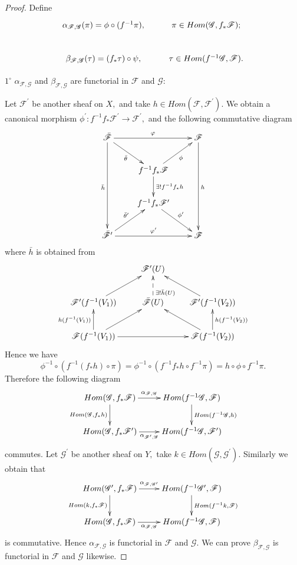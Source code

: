 \begin{proof}
Define
\[ \xymatrix{
   \alpha_{\mathscr{F},\mathscr{G}}(\pi)=\phi\circ(f^{-1}\pi), &
   \pi\in Hom(\mathscr{G}, f_{\ast}\mathscr{F});              \\
   \beta_{\mathscr{F},\mathscr{G}}(\tau)=(f_{\ast}\tau)\circ\psi, &
   \tau\in Hom(f^{-1}\mathscr{G}, \mathscr{F}). }  \]

$\mathit{1^{\circ}}$ $\alpha_{\mathscr{F},\mathscr{G}}$ and
$\beta_{\mathscr{F},\mathscr{G}}$ are functorial in $\mathscr{F}$
and $\mathscr{G}:$

Let $\mathscr{F}^{\prime}$ be another sheaf on $X,$ and take $h\in
Hom(\mathscr{F}, \mathscr{F}^{\prime}).$ We obtain a canonical
morphism $\phi^{\prime}:
f^{-1}f_{\ast}\mathscr{F}^{\prime}\rightarrow \mathscr{F}^{\prime},$
and the following commutative diagram
\[ \xymatrix{
   \bar{\mathscr{F}} \ar[ddd]_{\bar{h}} \ar[dr]_-{\bar{\theta}}
   \ar[rr]^-{\varphi} & & \mathscr{F} \ar[ddd]^h              \\
   & f^{-1}f_{\ast}\mathscr{F} \ar[ur]_-{\phi} \ar[d]^-{\exists!
   f^{-1}f_{\ast}h}                                           \\
   & f^{-1}f_{\ast}\mathscr{F}^{\prime} \ar[dr]^-{\phi^{\prime}}\\
   \bar{\mathscr{F}}^{\prime} \ar[ur]^-{\bar{\theta}^{\prime}}
   \ar[rr]^-{\varphi^{\prime}} & & \mathscr{F} }  \]
where $\bar{h}$ is obtained from
\[ \xymatrix{
   & \mathscr{F}^{\prime}(U) \\
   \mathscr{F}^{\prime}(f^{-1}(V_1)) \ar[ur] & \bar{\mathscr{F}}(U)
   \ar@{-->}[u]_(.3){\exists! \bar{h}(U)} &
   \mathscr{F}^{\prime}(f^{-1}(V_2)) \ar[ul]                       \\
   \mathscr{F}(f^{-1}(V_1)) \ar[u]^{h(f^{-1}(V_1))} \ar[ur] \ar[rr] &
   & \mathscr{F}(f^{-1}(V_2)) \ar[ul] \ar[u]_{h(f^{-1}(V_2))} }  \]
Hence we have
$$\phi^{-1}\circ(f^{-1}(f_{\ast}h)\circ\pi)=\phi^{-1}\circ(f^{-1}f_{\ast}h\circ f^{-1}\pi)=h\circ\phi\circ f^{-1}\pi.$$
Therefore the following diagram
\[ \xymatrix{
   Hom(\mathscr{G}, f_{\ast}\mathscr{F}) \ar[d]_{Hom(\mathscr{G},
   f_{\ast}h)} \ar[r]^-{\alpha_{\mathscr{F}, \mathscr{G}}} &
   Hom(f^{-1}\mathscr{G},\mathscr{F}) \ar[d]^{Hom(f^{-1}\mathscr{G},
   h)}   \\
   Hom(\mathscr{G}, f_{\ast}\mathscr{F}^{\prime}) \ar[r]_-{\alpha_{\mathscr{F}^{\prime},
   \mathscr{G}}} & Hom(f^{-1}\mathscr{G},\mathscr{F}^{\prime}) }  \]
commutes. Let $\mathscr{G}^{\prime}$ be another sheaf on $Y,$ take
$k\in Hom(\mathscr{G}, \mathscr{G}^{\prime}).$ Similarly we obtain
that
\[ \xymatrix{
   Hom(\mathscr{G}^{\prime}, f_{\ast}\mathscr{F}) \ar[d]_{Hom(k,
   f_{\ast}\mathscr{F})} \ar[r]^-{\alpha_{\mathscr{F}, \mathscr{G}^{\prime}}}
   & Hom(f^{-1}\mathscr{G}^{\prime}, \mathscr{F})
   \ar[d]^{Hom(f^{-1}k, \mathscr{F})}                             \\
   Hom(\mathscr{G}, f_{\ast}\mathscr{F}) \ar[r]_-{\alpha_{\mathscr{F},
   \mathscr{G}}} & Hom(f^{-1}\mathscr{G},\mathscr{F}) }  \]
is commutative. Hence $\alpha_{\mathscr{F}, \mathscr{G}}$ is
functorial in $\mathscr{F}$ and $\mathscr{G}.$ We can prove
$\beta_{\mathscr{F}, \mathscr{G}}$ is functorial in $\mathscr{F}$
and $\mathscr{G}$ likewise.


\end{proof}
